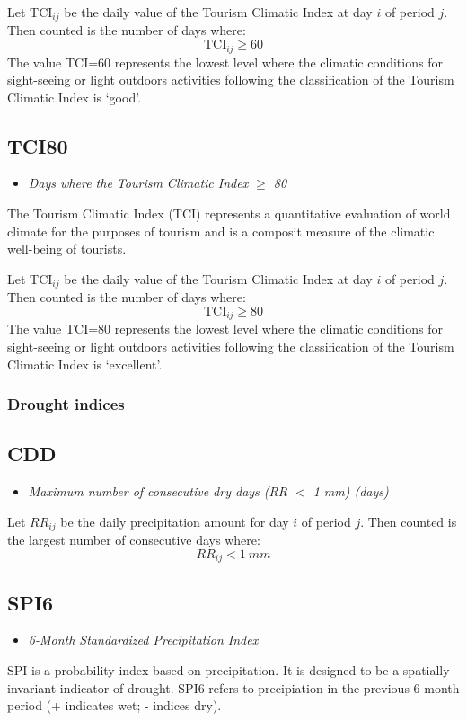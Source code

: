 \documentclass[a4paper,11pt]{article}
\begin{document}
Let TCI$_{ij}$ be the daily value of the Tourism Climatic Index at day $i$ of period $j$.
Then counted is the number of days where:
\begin{equation*}
\text{TCI}_{ij} \ge 60
\end{equation*}
The value TCI=60 represents the lowest level where the climatic conditions for sight-seeing or light outdoors
activities following the classification of the Tourism Climatic Index is `good'.


\subsection*{TCI80}
\begin{itemize}
\item \textit{Days where the Tourism Climatic Index $\ge$ 80}
\end{itemize}
The Tourism Climatic Index (TCI) represents a quantitative evaluation
of world climate for the purposes of tourism and is a composit
measure of the climatic well-being of tourists. 

Let TCI$_{ij}$ be the daily value of the Tourism Climatic Index at day $i$ of period $j$.
Then counted is the number of days where:
\begin{equation*}
\text{TCI}_{ij} \ge 80
\end{equation*}
The value TCI=80 represents the lowest level where the climatic conditions for sight-seeing or light outdoors
activities following the classification of the Tourism Climatic Index is `excellent'.

\subsubsection{Drought indices}

\subsection*{CDD}
\begin{itemize}
\item \textit{Maximum number of consecutive dry days (RR $<$ 1 mm) (days)}
\end{itemize}
Let $RR_{ij}$ be the daily precipitation amount for day $i$ of period
$j$. Then counted is the largest number of consecutive days where:
\begin{equation*}
RR_{ij} < 1~mm
\end{equation*}

\subsection*{SPI6}
\begin{itemize}
\item \textit{6-Month Standardized Precipitation Index}
\end{itemize}
SPI is a probability index based on precipitation. It is designed to
be a spatially invariant indicator of drought. SPI6 refers to
precipiation in the previous 6-month period (+ indicates wet; -
indices dry).
\end{document}
